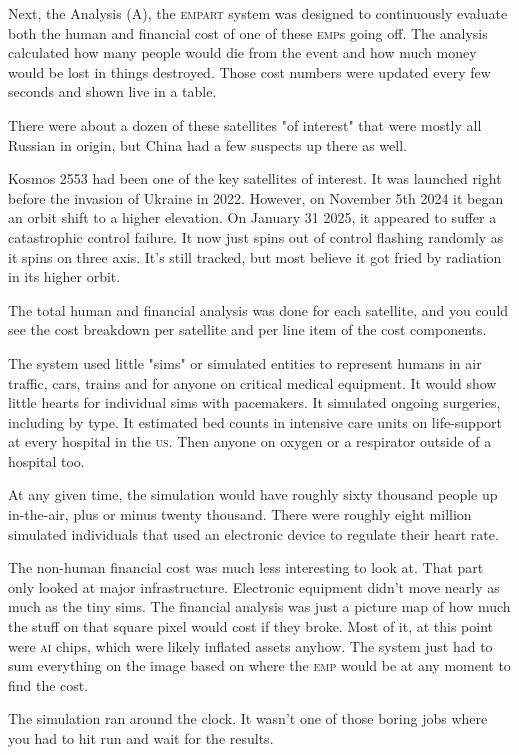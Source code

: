\documentclass[a5paper, symmetric]{tufte-book}
\begin{document}
Next, the Analysis (A), the \textsc{empart} system was designed to continuously evaluate both the human and financial cost of one of these \textsc{emp}s going off. The analysis calculated how many people would die from the event and how much money would be lost in things destroyed. Those cost numbers were updated every few seconds and shown live in a table. 

There were about a dozen of these satellites "of interest" that were mostly all Russian in origin, but China had a few suspects up there as well. 

Kosmos 2553 had been one of the key satellites of interest. It was launched right before the invasion of Ukraine in 2022. However, on November 5th 2024 it began an orbit shift to a higher elevation. On January 31 2025, it appeared to suffer a catastrophic control failure. It now just spins out of control flashing randomly as it spins on three axis. It's still tracked, but most believe it got fried by radiation in its higher orbit.

The total human and financial analysis was done for each satellite, and you could see the cost breakdown per satellite and per line item of the cost components. 

The system used little "sims" or simulated entities to represent humans in air traffic, cars, trains and for anyone on critical medical equipment. It would show little hearts for individual sims with pacemakers. It simulated ongoing surgeries, including by type. It estimated bed counts in intensive care units on life-support at every hospital in the \textsc{us}. Then anyone on oxygen or a respirator outside of a hospital too. 

At any given time, the simulation would have roughly sixty thousand people up in-the-air, plus or minus twenty thousand. There were roughly eight million simulated individuals that used an electronic device to regulate their heart rate.

The non-human financial cost was much less interesting to look at. That part only looked at major infrastructure. Electronic equipment didn't move nearly as much as the tiny sims. The financial analysis was just a picture map of how much the stuff on that square pixel would cost if they broke. Most of it, at this point were \textsc{ai} chips, which were likely inflated assets anyhow. The system just had to sum everything on the image based on where the \textsc{emp} would be at any moment to find the cost. 

The simulation ran around the clock. It wasn't one of those boring jobs where you had to hit run and wait for the results. 
\end{document}
